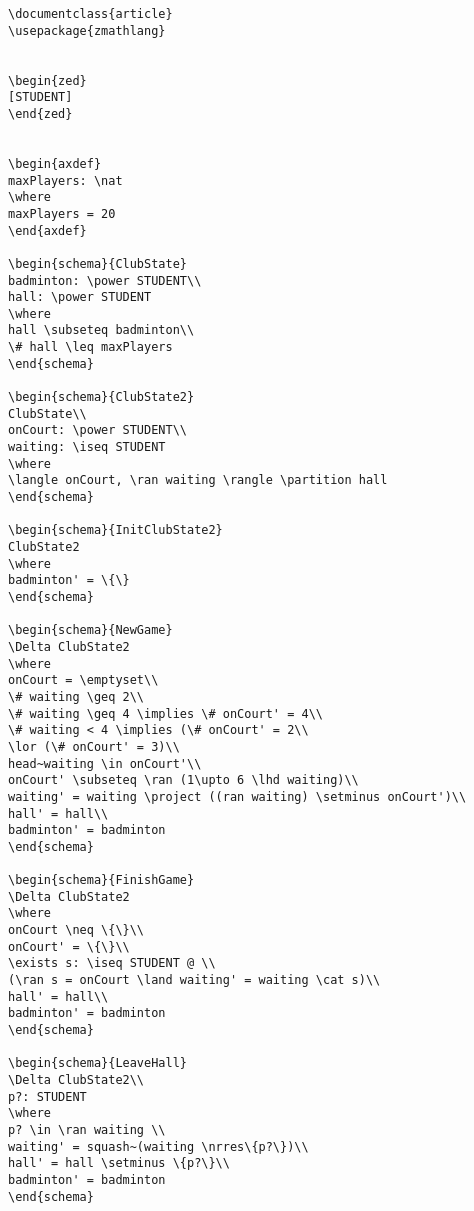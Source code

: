\begin{verbatim}
\documentclass{article}
\usepackage{zmathlang}


\begin{zed}
[STUDENT]
\end{zed}


\begin{axdef}
maxPlayers: \nat
\where
maxPlayers = 20
\end{axdef}

\begin{schema}{ClubState}
badminton: \power STUDENT\\
hall: \power STUDENT
\where
hall \subseteq badminton\\
\# hall \leq maxPlayers
\end{schema}

\begin{schema}{ClubState2}
ClubState\\
onCourt: \power STUDENT\\
waiting: \iseq STUDENT
\where
\langle onCourt, \ran waiting \rangle \partition hall
\end{schema}

\begin{schema}{InitClubState2}
ClubState2
\where
badminton' = \{\}
\end{schema}

\begin{schema}{NewGame}
\Delta ClubState2
\where
onCourt = \emptyset\\
\# waiting \geq 2\\
\# waiting \geq 4 \implies \# onCourt' = 4\\
\# waiting < 4 \implies (\# onCourt' = 2\\
\lor (\# onCourt' = 3)\\
head~waiting \in onCourt'\\
onCourt' \subseteq \ran (1\upto 6 \lhd waiting)\\
waiting' = waiting \project ((ran waiting) \setminus onCourt')\\
hall' = hall\\
badminton' = badminton
\end{schema}

\begin{schema}{FinishGame}
\Delta ClubState2
\where
onCourt \neq \{\}\\
onCourt' = \{\}\\
\exists s: \iseq STUDENT @ \\
(\ran s = onCourt \land waiting' = waiting \cat s)\\
hall' = hall\\
badminton' = badminton
\end{schema}

\begin{schema}{LeaveHall}
\Delta ClubState2\\
p?: STUDENT
\where
p? \in \ran waiting \\
waiting' = squash~(waiting \nrres\{p?\})\\
hall' = hall \setminus \{p?\}\\
badminton' = badminton
\end{schema}


\end{verbatim}